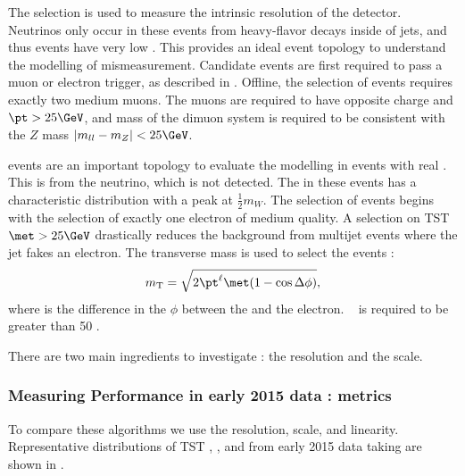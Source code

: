 The \Zll selection is used to measure the intrinsic \met resolution of the detector.
Neutrinos only occur in these events from heavy-flavor decays inside of jets, and thus \Zll events have very low \met.
This provides an ideal event topology to understand the modelling of \met mismeasurement.
Candidate \Zmm events are first required to pass a muon or electron trigger, as described in .
Offline, the selection of \Zmm events requires exactly two medium muons.
The muons are required to have opposite charge and $\pt > 25 \GeV$, and mass of the dimuon system is required to be consistent with the $Z$ mass $|m_{ll} - m_Z | < 25 \GeV$.

\Wln events are an important topology to evaluate the \met modelling in events with real \met.
This \met is from the neutrino, which is not detected.
The \met in these events has a characteristic distribution with a peak at $\frac{1}{2} m_W$.
The selection of \Wen events begins with the selection of exactly one electron of medium quality.
A selection on TST $\met > 25 \GeV$  drastically reduces the background from multijet events where the jet fakes an electron.
The transverse mass is used to select the \Wen events :
\begin{equation}
  \mT = \sqrt{ 2\pt^{\ell} \met (1-\cos{\deltaPhi}) },
\label{eq:mT}
\end{equation}
where \deltaPhi is the difference in the $\phi$ between the \met and the electron.
\mT~ is required to be greater than 50 \GeV.

There are two main ingredients to investigate : the \met resolution and the \met scale.

\subsubsection{Measuring \met Performance in early 2015 data : metrics}

To compare these algorithms we use the \met resolution, \met scale, and linearity.
Representative distributions of TST , , and  \met from early 2015 data taking are shown in .

